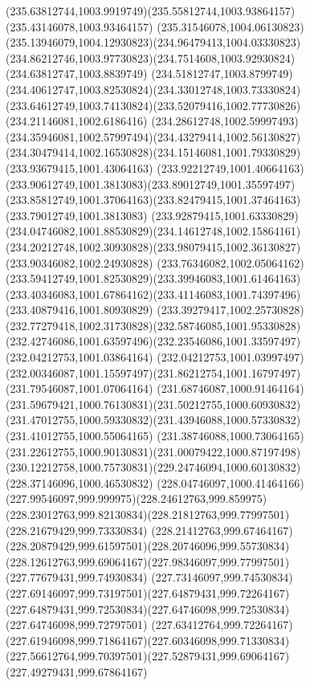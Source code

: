{{  \curveto(235.63812744,1003.9919749)(235.55812744,1003.93864157)(235.43146078,1003.93464157)
  \curveto(235.31546078,1004.06130823)(235.13946079,1004.12930823)(234.96479413,1004.03330823)
  \curveto(234.86212746,1003.97730823)(234.7514608,1003.92930824)(234.63812747,1003.8839749)
  \curveto(234.51812747,1003.8799749)(234.40612747,1003.82530824)(234.33012748,1003.73330824)
  \curveto(233.64612749,1003.74130824)(233.52079416,1002.77730826)(234.21146081,1002.6186416)
  \curveto(234.28612748,1002.59997493)(234.35946081,1002.57997494)(234.43279414,1002.56130827)
  \curveto(234.30479414,1002.16530828)(234.15146081,1001.79330829)(233.93679415,1001.43064163)
  \curveto(233.92212749,1001.40664163)(233.90612749,1001.3813083)(233.89012749,1001.35597497)
  \curveto(233.85812749,1001.37064163)(233.82479415,1001.37464163)(233.79012749,1001.3813083)
  \curveto(233.92879415,1001.63330829)(234.04746082,1001.88530829)(234.14612748,1002.15864161)
  \curveto(234.20212748,1002.30930828)(233.98079415,1002.36130827)(233.90346082,1002.24930828)
  \curveto(233.76346082,1002.05064162)(233.59412749,1001.82530829)(233.39946083,1001.61464163)
  \curveto(233.40346083,1001.67864162)(233.41146083,1001.74397496)(233.40879416,1001.80930829)
  \curveto(233.39279417,1002.25730828)(232.77279418,1002.31730828)(232.58746085,1001.95330828)
  \curveto(232.42746086,1001.63597496)(232.23546086,1001.33597497)(232.04212753,1001.03864164)
  \lineto(232.04212753,1001.03997497)
  \curveto(232.00346087,1001.15597497)(231.86212754,1001.16797497)(231.79546087,1001.07064164)
  \curveto(231.68746087,1000.91464164)(231.59679421,1000.76130831)(231.50212755,1000.60930832)
  \curveto(231.47012755,1000.59330832)(231.43946088,1000.57330832)(231.41012755,1000.55064165)
  \curveto(231.38746088,1000.73064165)(231.22612755,1000.90130831)(231.00079422,1000.87197498)
  \curveto(230.12212758,1000.75730831)(229.24746094,1000.60130832)(228.37146096,1000.46530832)
  \curveto(228.04746097,1000.41464166)(227.99546097,999.999975)(228.24612763,999.859975)
  \curveto(228.23012763,999.82130834)(228.21812763,999.77997501)(228.21679429,999.73330834)
  \curveto(228.21412763,999.67464167)(228.20879429,999.61597501)(228.20746096,999.55730834)
  \curveto(228.12612763,999.69064167)(227.98346097,999.77997501)(227.77679431,999.74930834)
  \curveto(227.73146097,999.74530834)(227.69146097,999.73197501)(227.64879431,999.72264167)
  \curveto(227.64879431,999.72530834)(227.64746098,999.72530834)(227.64746098,999.72797501)
  \curveto(227.63412764,999.72264167)(227.61946098,999.71864167)(227.60346098,999.71330834)
  \curveto(227.56612764,999.70397501)(227.52879431,999.69064167)(227.49279431,999.67864167)
}}
